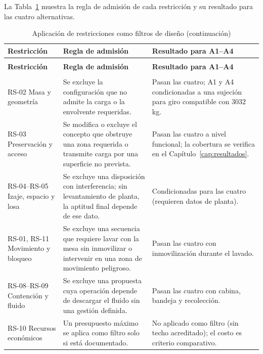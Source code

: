 La Tabla~\ref{tab:filtros_revision} muestra la regla de admisión de cada restricción y su resultado para las cuatro alternativas.

\begingroup
\small\singlespacing
\setlength{\parskip}{0pt}
\setlength{\tabcolsep}{4pt}
\renewcommand{\arraystretch}{1.1}
\begin{longtable}{@{}>{\raggedright\arraybackslash}p{2.3cm}>{\raggedright\arraybackslash}p{}>{\raggedright\arraybackslash}p{}@{}}
\caption{Aplicación de restricciones como filtros de diseño}\label{tab:filtros_revision}\\
\toprule
\textbf{Restricción} & \textbf{Regla de admisión} & \textbf{Resultado para A1--A4}\\
\midrule\endfirsthead
\caption[]{Aplicación de restricciones como filtros de diseño (continuación)}\\
\toprule
\textbf{Restricción} & \textbf{Regla de admisión} & \textbf{Resultado para A1--A4}\\
\midrule\endhead
\midrule\multicolumn{3}{r}{\textit{Continúa en la página siguiente.}}\\\endfoot
\bottomrule\endlastfoot
RS-02 Masa y geometría & Se excluye la configuración que no admite la carga o la envolvente requeridas. & Pasan las cuatro; A1 y A4 condicionadas a una sujeción para giro compatible con 3032 kg.\\
RS-03 Preservación y acceso & Se modifica o excluye el concepto que obstruye una zona requerida o transmite carga por una superficie no prevista. & Pasan las cuatro a nivel funcional; la cobertura se verifica en el Capítulo~\ref{cap:resultados}.\\
RS-04--RS-05 Izaje, espacio y losa & Se excluye una disposición con interferencia; sin levantamiento de planta, la aptitud final depende de ese dato. & Condicionadas para las cuatro (requieren datos de planta).\\
RS-01, RS-11 Movimiento y bloqueo & Se excluye una secuencia que requiere lavar con la mesa sin inmovilizar o intervenir en una zona de movimiento peligroso. & Pasan las cuatro con inmovilización durante el lavado.\\
RS-08--RS-09 Contención y fluido & Se excluye una propuesta cuya operación depende de descargar el fluido sin una gestión definida. & Pasan las cuatro con cabina, bandeja y recolección.\\
RS-10 Recursos económicos & Un presupuesto máximo se aplica como filtro solo si está documentado. & No aplicado como filtro (sin techo acreditado); el costo es criterio comparativo.\\
\end{longtable}
\endgroup


